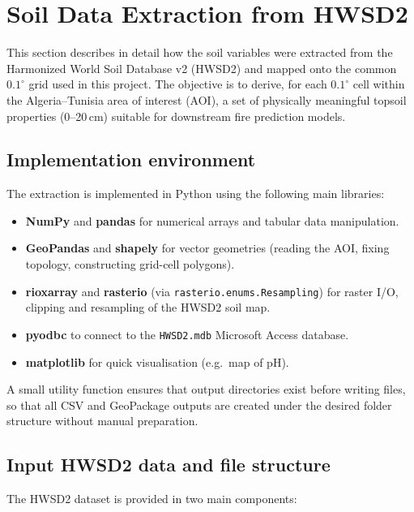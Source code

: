 \section{Soil Data Extraction from HWSD2}\label{annexe:soil_extraction}

This section describes in detail how the soil variables were extracted from the
Harmonized World Soil Database v2 (HWSD2) and mapped onto the common $0.1^{\circ}$
grid used in this project. The objective is to derive, for each $0.1^{\circ}$ cell
within the Algeria--Tunisia area of interest (AOI), a set of physically meaningful
topsoil properties (0--20\,cm) suitable for downstream fire prediction models.

\subsection{Implementation environment}

The extraction is implemented in Python using the following main libraries:

\begin{itemize}
    \item \textbf{NumPy} and \textbf{pandas} for numerical arrays and tabular
    data manipulation.
    \item \textbf{GeoPandas} and \textbf{shapely} for vector geometries
    (reading the AOI, fixing topology, constructing grid-cell polygons).
    \item \textbf{rioxarray} and \textbf{rasterio} (via
    \texttt{rasterio.enums.Resampling}) for raster I/O, clipping and
    resampling of the HWSD2 soil map.
    \item \textbf{pyodbc} to connect to the \texttt{HWSD2.mdb} Microsoft
    Access database.
    \item \textbf{matplotlib} for quick visualisation (e.g.\ map of pH).
\end{itemize}

A small utility function ensures that output directories exist before writing
files, so that all CSV and GeoPackage outputs are created under the desired
folder structure without manual preparation.

\subsection{Input HWSD2 data and file structure}

The HWSD2 dataset is provided in two main components:

